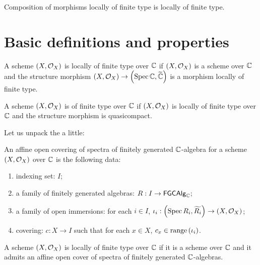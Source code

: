 \begin{proposition}\label{thm:locally_of_finite_type_comp}
  Composition of morphisms locally of finite type is locally of finite type.
\end{proposition}

\section{Basic definitions and properties}

\begin{definition}\label{def:SchemeLocallyOfFiniteType}
  A scheme $\left(X, \mathcal{O}_{X}\right)$ is locally of finite type over $\mathbb{C}$ if $\left(X, \mathcal{O}_{X}\right)$ is a scheme over $\mathbb{C}$ and the structure morphism $\left(X, \mathcal{O}_{X}\right) \to \left(\operatorname*{Spec}{\mathbb{C}}, \widetilde{\mathbb{C}}\right)$ is a morphism locally of finite type.
\end{definition}

\begin{definition}
  A scheme $\left(X, \mathcal{O}_{X}\right)$ is of finite type over $\mathbb{C}$ if $\left(X, \mathcal{O}_{X}\right)$ is locally of finite type over $\mathbb{C}$ and the structure morphism is quasicompact.

\end{definition}

Let us unpack the  a little:


\begin{definition}
  An affine open covering of spectra of finitely generated $\mathbb{C}$-algebra for a scheme $\left(X, \mathcal{O}_{X}\right)$ over $\mathbb{C}$ is the following data:
    \begin{enumerate}
        \item indexing set: $I$;
        \item a family of finitely generated algebras: $R : I \to \mathsf{FGCAlg}_{\mathbb{C}}$;
        \item a family of open immersions: for each $i \in I$, $\iota_i: \left(\operatorname*{Spec}{R_i}, \widetilde{R_i}\right) \to \left(X, \mathcal{O}_{X}\right)$;
        \item covering: $c : X \to I$ such that for each $x \in X$, $c_x \in \operatorname*{range}\left({\iota_i}\right)$.
    \end{enumerate}
\end{definition}

\begin{lemma}
    A scheme $\left(X, \mathcal{O}_{X}\right)$ is locally of finite type over $\mathbb{C}$ if it is a scheme over $\mathbb{C}$ and it admits an affine open cover of spectra of finitely generated $\mathbb{C}$-algebras.
\end{lemma}

